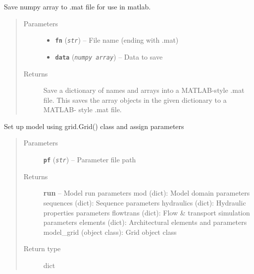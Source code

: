 \documentclass[letterpaper,10pt,english]{sphinxmanual}
\begin{document}
\begin{fulllineitems}
\label{hyvr:hyvr.hyvr.utils.matlab_save}
Save numpy array to .mat file for use in matlab.
\begin{quote}\begin{description}
\item[{Parameters}] \leavevmode\begin{itemize}
\item {} 
\textbf{\texttt{fn}} (\emph{\texttt{str}}) -- File name (ending with .mat)

\item {} 
\textbf{\texttt{data}} (\emph{\texttt{numpy array}}) -- Data to save

\end{itemize}

\item[{Returns}] \leavevmode
Save a dictionary of names and arrays into a MATLAB-style .mat file.
This saves the array objects in the given dictionary to a MATLAB- style .mat file.

\end{description}\end{quote}

\end{fulllineitems}


\begin{fulllineitems}
\label{hyvr:hyvr.hyvr.utils.model_setup}
Set up model using grid.Grid() class and assign parameters
\begin{quote}\begin{description}
\item[{Parameters}] \leavevmode
\textbf{\texttt{pf}} (\emph{\texttt{str}}) -- Parameter file path

\item[{Returns}] \leavevmode
\textbf{run} -- Model run parameters
mod (dict):                     Model domain parameters
sequences (dict):               Sequence parameters
hydraulics (dict):              Hydraulic properties parameters
flowtrans (dict):               Flow \& transport simulation parameters
elements (dict):                Architectural elements and parameters
model\_grid (object class):      Grid object class

\item[{Return type}] \leavevmode
dict

\end{description}\end{quote}

\end{fulllineitems}
\end{document}
